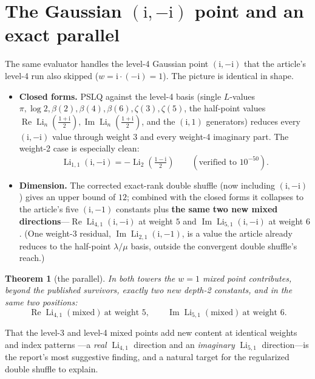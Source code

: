 \documentclass[11pt]{article}
\DeclareMathOperator{\Li}{Li}
\DeclareMathOperator{\Real}{Re}
\DeclareMathOperator{\Imag}{Im}
\newcommand{\iu}{\mathrm{i}}
\theoremstyle{plain}
\newtheorem{theorem}{Theorem}
\theoremstyle{remark}
\begin{document}
\section{The Gaussian \texorpdfstring{$(\iu,-\iu)$}{(i,-i)} point and an exact parallel}\label{sec:gauss}
\sloppy
The same evaluator handles the level-4 Gaussian point $(\iu,-\iu)$ that the article's level-4 run also
skipped ($w=\iu\cdot(-\iu)=1$). The picture is identical in shape.
\begin{itemize}
\item \textbf{Closed forms.} PSLQ against the level-4 basis (single $L$-values
  $\pi,\log 2,\beta(2),\beta(4),\beta(6),\zeta(3),\zeta(5)$, the half-point values
  $\Real\Li_n(\tfrac{1+\iu}2),\Imag\Li_n(\tfrac{1+\iu}2)$, and the $(\iu,1)$ generators) reduces every
  $(\iu,-\iu)$ value through weight $3$ and every weight-4 imaginary part. The weight-2 case is
  especially clean:
  \begin{equation}\label{eq:gauss-w2}
    \Li_{1,1}(\iu,-\iu)=-\Li_2\!\left(\tfrac{1-\iu}2\right)\qquad(\text{verified to } 10^{-50}).
  \end{equation}
\item \textbf{Dimension.} The corrected exact-rank double shuffle (now including $(\iu,-\iu)$) gives an
  upper bound of $12$; combined with the closed forms it collapses to the article's five $(\iu,-1)$
  constants plus \textbf{the same two new mixed directions}---$\Real\Li_{4,1}(\iu,-\iu)$ at weight $5$
  and $\Imag\Li_{5,1}(\iu,-\iu)$ at weight $6$. (One weight-3 residual, $\Imag\Li_{2,1}(\iu,-1)$, is a
  value the article already reduces to the half-point $\lambda/\mu$ basis, outside the convergent
  double shuffle's reach.)
\end{itemize}

\begin{theorem}[the parallel]\label{thm:parallel}
In \emph{both} towers the $w=1$ mixed point contributes, beyond the published survivors, exactly two
new depth-2 constants, and \emph{in the same two positions}:
\[
  \boxed{\ \Real\Li_{4,1}(\mathrm{mixed})\ \text{at weight }5,\qquad
            \Imag\Li_{5,1}(\mathrm{mixed})\ \text{at weight }6.\ }
\]
\end{theorem}
That the level-3 and level-4 mixed points add new content at identical weights and index patterns
---a \emph{real} $\Li_{4,1}$ direction and an \emph{imaginary} $\Li_{5,1}$ direction---is the report's
most suggestive finding, and a natural target for the regularized double shuffle to explain.
\end{document}
